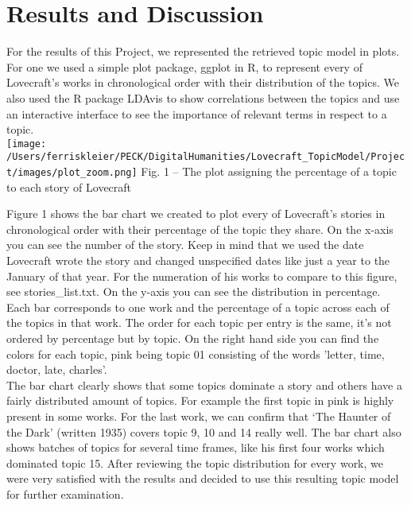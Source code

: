 \section{Results and Discussion}

For the results of this Project, we represented the retrieved topic model in plots. For one we 
used a simple plot package, ggplot in R, to represent every of Lovecraft’s works in chronological 
order with their distribution of the topics. We also used the R package LDAvis to show correlations 
between the topics and use an interactive interface to see the importance of relevant terms in 
respect to a topic.\\

\texttt{[image: /Users/ferriskleier/PECK/DigitalHumanities/Lovecraft\_TopicModel/Project/images/plot\_zoom.png]}
Fig. 1 – The plot assigning the percentage of a topic to each story of Lovecraft

Figure 1 shows the bar chart we created to plot every of Lovecraft’s stories in chronological order 
with their percentage of the topic they share. On the x-axis you can see the number of the story. Keep in mind that we used the date Lovecraft 
wrote the story and changed unspecified dates like just a year to the January of that year. For 
the numeration of his works to compare to this figure, see stories\_list.txt. On the y-axis you 
can see the distribution in percentage. Each bar corresponds to one work and the percentage of 
a topic across each of the topics in that work. The order for each topic per entry is the same, 
it’s not ordered by percentage but by topic. On the right hand side you can find the colors for 
each topic, pink being topic 01 consisting of the words 'letter, time, doctor, late, charles'.\\

The bar chart clearly shows that some topics dominate a story and others have a fairly distributed 
amount of topics. For example the first topic in pink is highly present in some works. For the 
last work, we can confirm that ‘The Haunter of the Dark’ (written 1935) covers topic 9, 10 and 
14 really well. The bar chart also shows batches of topics for several time frames, like his 
first four works which dominated topic 15. After reviewing the topic distribution for every 
work, we were very satisfied with the results and decided to use this resulting topic model 
for further examination.\\

